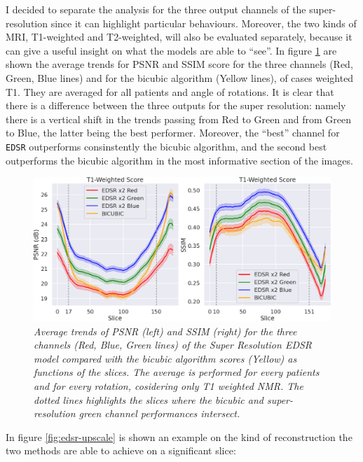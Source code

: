 \documentclass[12pt,a4paper]{report}
\begin{document}
I decided to separate the analysis for the three output channels of the super-resolution since it can highlight particular behaviours. 
Moreover, the two kinds of MRI, T1-weighted and T2-weighted, will also be evaluated separately, because it can give a useful insight on what the models are able to ``see''.  
In figure \ref{fig:edsr-score-slide-t1} are shown the average trends for PSNR and SSIM score for the three channels (Red, Green, Blue lines) and for the bicubic algorithm (Yellow lines), of cases weighted T1.
They are averaged for all patients and angle of rotations.
It is clear that there is a difference between the three outputs for the super resolution: namely there is a vertical shift in the trends passing from Red to Green and from Green to Blue, the latter being the best performer.
Moreover, the ``best'' channel for {\tt EDSR} outperforms consinstently the bicubic algorithm, and the second best outperforms the bicubic algorithm in the most informative section of the images. 

\begin{figure}[H]
  \includegraphics[scale=0.37]{./images/EDSR_score_slide_t1_all.png}
  \caption{\it Average trends of PSNR (left) and SSIM (right) for the three channels (Red, Blue, Green lines) of the Super Resolution EDSR model compared with the bicubic algorithm scores (Yellow) as functions of the slices. The average is performed for every patients and for every rotation,  cosidering only T1 weighted NMR. The dotted lines highlights the slices where the bicubic and super-resolution green channel performances intersect.}
  \label{fig:edsr-score-slide-t1}
\end{figure}

In figure \ref{fig:edsr-upscale} is shown an example on the kind of reconstruction the two methods are able to achieve on a significant slice: 
\end{document}
